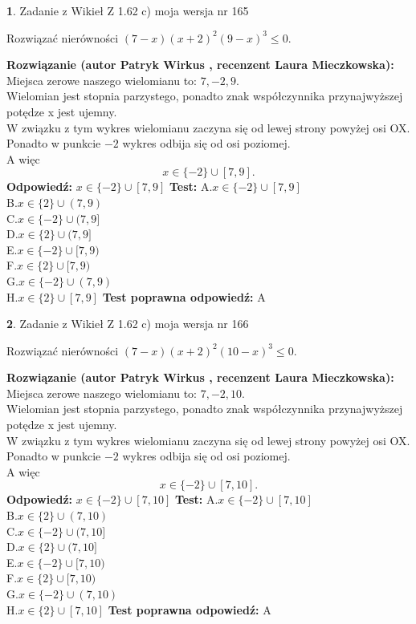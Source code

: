 \documentclass[12pt, a4paper]{article}
\theoremstyle{definition} %
\newtheorem{zad}{}
\newcommand{\zadStart}[1]{\begin{zad}#1\newline}
\newcommand{\zadStop}{\end{zad}}
\newcommand{\rozwStart}[2]{\noindent \textbf{Rozwiązanie (autor #1 , recenzent #2): }\newline}
\newcommand{\rozwStop}{\newline}
\newcommand{\odpStart}{\noindent \textbf{Odpowiedź:}\newline}
\newcommand{\odpStop}{\newline}
\newcommand{\testStart}{\noindent \textbf{Test:}\newline}
\newcommand{\testStop}{\newline}
\newcommand{\kluczStart}{\noindent \textbf{Test poprawna odpowiedź:}\newline}
\newcommand{\kluczStop}{\newline}
\begin{document}
\zadStart{Zadanie z Wikieł Z 1.62 c) moja wersja nr 165}

Rozwiązać nierówności $(7-x)(x+2)^{2}(9-x)^{3}\le0$.
\zadStop
\rozwStart{Patryk Wirkus}{Laura Mieczkowska}
Miejsca zerowe naszego wielomianu to: $7, -2, 9$.\\
Wielomian jest stopnia parzystego, ponadto znak współczynnika przy\linebreak najwyższej potędze x jest ujemny.\\ W związku z tym wykres wielomianu zaczyna się od lewej strony powyżej osi OX.\\
Ponadto w punkcie $-2$ wykres odbija się od osi poziomej.\\
A więc $$x \in \{-2\} \cup [7,9].$$
\rozwStop
\odpStart
$x \in \{-2\} \cup [7,9]$
\odpStop
\testStart
A.$x \in \{-2\} \cup [7,9]$\\
B.$x \in \{2\} \cup (7,9)$\\
C.$x \in \{-2\} \cup (7,9]$\\
D.$x \in \{2\} \cup (7,9]$\\
E.$x \in \{-2\} \cup [7,9)$\\
F.$x \in \{2\} \cup [7,9)$\\
G.$x \in \{-2\} \cup (7,9)$\\
H.$x \in \{2\} \cup [7,9]$
\testStop
\kluczStart
A
\kluczStop



\zadStart{Zadanie z Wikieł Z 1.62 c) moja wersja nr 166}

Rozwiązać nierówności $(7-x)(x+2)^{2}(10-x)^{3}\le0$.
\zadStop
\rozwStart{Patryk Wirkus}{Laura Mieczkowska}
Miejsca zerowe naszego wielomianu to: $7, -2, 10$.\\
Wielomian jest stopnia parzystego, ponadto znak współczynnika przy\linebreak najwyższej potędze x jest ujemny.\\ W związku z tym wykres wielomianu zaczyna się od lewej strony powyżej osi OX.\\
Ponadto w punkcie $-2$ wykres odbija się od osi poziomej.\\
A więc $$x \in \{-2\} \cup [7,10].$$
\rozwStop
\odpStart
$x \in \{-2\} \cup [7,10]$
\odpStop
\testStart
A.$x \in \{-2\} \cup [7,10]$\\
B.$x \in \{2\} \cup (7,10)$\\
C.$x \in \{-2\} \cup (7,10]$\\
D.$x \in \{2\} \cup (7,10]$\\
E.$x \in \{-2\} \cup [7,10)$\\
F.$x \in \{2\} \cup [7,10)$\\
G.$x \in \{-2\} \cup (7,10)$\\
H.$x \in \{2\} \cup [7,10]$
\testStop
\kluczStart
A
\kluczStop
\end{document}
